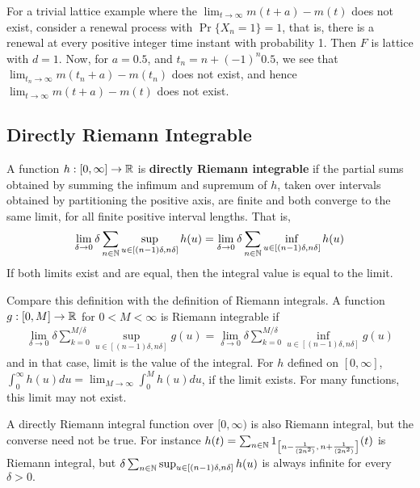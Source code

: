 \documentclass[a4paper,10pt,english]{article}
\begin{document}
\begin{exmp}
\label{eg:lattice limit}
For a trivial lattice example where the $\lim_{t\to \infty} m(t+a)-m(t)$ does not exist, consider a renewal process with $\Pr\{X_n = 1\} = 1$, that is, there is a renewal at every positive integer time instant with probability 1. Then $F$ is lattice with $d=1.$ Now, for $a=0.5$, and $t_n = n+(-1)^n 0.5$, we see that $\lim_{t_n \to \infty} m(t_n+a)-m(t_n)$ does not exist, and hence $\lim_{t \to \infty} m(t+a)-m(t)$ does not exist.
\end{exmp}


\subsection{Directly Riemann Integrable}
\begin{defn}%
A function $h: [0,\infty] \rightarrow \mathbb{R}$ is \textbf{directly Riemann integrable} if the partial sums obtained by summing the infimum and supremum of $h$, taken over intervals obtained by partitioning the positive axis, are finite and both converge to the same limit, for all finite positive interval lengths. That is,
\begin{equation*}
	\lim_{\delta \rightarrow 0} \delta \sum_{n \in \mathbb{N}}\sup_{ u \in [(n-1)\delta,n\delta]}h(u)=\lim_{\delta \rightarrow 0} \delta \sum_{n \in \mathbb{N}}\inf_{ u \in [(n-1)\delta,n\delta]}h(u)  
\end{equation*}   
 If both limits exist and are equal, then the integral value is equal to the limit. 
\end{defn}
	Compare this definition with the definition of Riemann integrals. A function $g: [0, M] \rightarrow \mathbb{R} $ for $0<M<\infty$ is Riemann integrable if 
   \begin{eqnarray*}
  \lim_{\delta \rightarrow 0} \delta \sum_{k=0}^{M/\delta}\sup_{ u \in [(n-1)\delta,n\delta]}g(u)=\lim_{\delta \rightarrow 0} \delta \sum_{k=0}^{M/\delta}\inf_{ u \in [(n-1)\delta,n\delta]}g(u)  
  \end{eqnarray*} 
   and in that case, limit is the value of the integral. For $h$ defined on $[0,\infty]$, $\int_{0}^{\infty}h(u)du = \lim_{M \rightarrow \infty}\int_{0}^{M}h(u)du$, if the limit exists. For many functions, this limit may not exist.



\begin{rem}
A directly Riemann integral function over $[0,\infty)$ is also Riemann integral, but the converse need not be true. For instance $h(t) = \sum_{n\in\mathbb{N}}1_{\left[n-\frac{1}{(2n^2)},\,n+\frac{1}{(2n^2)}\right]}(t)$ is Riemann integral, but $\delta \sum_{n \in \mathbb{N}}\sup_{ u \in [(n-1)\delta,n\delta]}h(u)$ is always infinite for every $\delta>0.$
\end{rem}  
\end{document}
